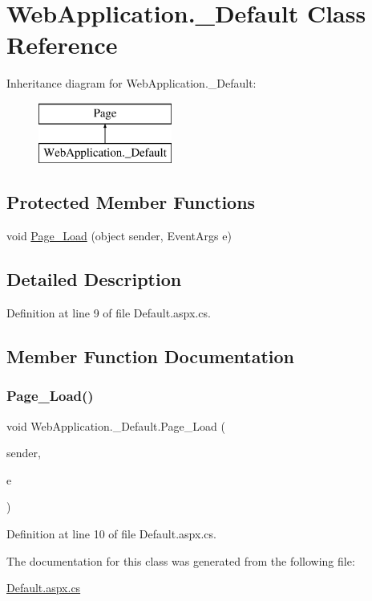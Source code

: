 \hypertarget{classWebApplication_1_1__Default}{}\section{Web\+Application.\+\_\+\+Default Class Reference}
\label{classWebApplication_1_1__Default}
Inheritance diagram for Web\+Application.\+\_\+\+Default\+:\begin{figure}[H]
\begin{center}
\leavevmode
\includegraphics[height=2.000000cm]{d6/df0/classWebApplication_1_1__Default}
\end{center}
\end{figure}
\subsection*{Protected Member Functions}
\begin{DoxyCompactItemize}
\item 
void \mbox{\hyperlink{classWebApplication_1_1__Default_a774fea88a9ee1de6a35a9df129075a8a}{Page\+\_\+\+Load}} (object sender, Event\+Args e)
\end{DoxyCompactItemize}


\subsection{Detailed Description}


Definition at line 9 of file Default.\+aspx.\+cs.



\subsection{Member Function Documentation}
\mbox{\label{classWebApplication_1_1__Default_a774fea88a9ee1de6a35a9df129075a8a}} 
\subsubsection{\texorpdfstring{Page\_Load()}{Page\_Load()}}
{\footnotesize\ttfamily void Web\+Application.\+\_\+\+Default.\+Page\+\_\+\+Load (\begin{DoxyParamCaption}\item[{object}]{sender,  }\item[{Event\+Args}]{e }\end{DoxyParamCaption})\hspace{0.3cm}{\ttfamily [protected]}}



Definition at line 10 of file Default.\+aspx.\+cs.



The documentation for this class was generated from the following file\+:\begin{DoxyCompactItemize}
\item 
\mbox{\hyperlink{Default_8aspx_8cs}{Default.\+aspx.\+cs}}\end{DoxyCompactItemize}
